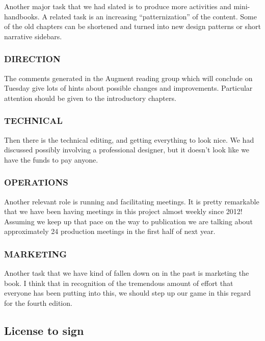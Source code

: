 Another major task that we had slated is to produce more activities and
mini-handbooks. A related task is an increasing ``patternization'' of
the content. Some of the old chapters can be shortened and turned into
new design patterns or short narrative sidebars.

\hypertarget{direction}{%
\subsubsection{DIRECTION}\label{direction}}

The comments generated in the Augment reading group which will conclude
on Tuesday give lots of hints about possible changes and improvements.
Particular attention should be given to the introductory chapters.

\hypertarget{technical}{%
\subsubsection{TECHNICAL}\label{technical}}

Then there is the technical editing, and getting everything to look
nice. We had discussed possibly involving a professional designer, but
it doesn't look like we have the funds to pay anyone.

\hypertarget{operations}{%
\subsubsection{OPERATIONS}\label{operations}}

Another relevant role is running and facilitating meetings. It is pretty
remarkable that we have been having meetings in this project almost
weekly since 2012! Assuming we keep up that pace on the way to
publication we are talking about approximately 24 production meetings in
the first half of next year.

\hypertarget{marketing}{%
\subsubsection{MARKETING}\label{marketing}}

Another task that we have kind of fallen down on in the past is
marketing the book. I think that in recognition of the tremendous amount
of effort that everyone has been putting into this, we should step up
our game in this regard for the fourth edition.

\hypertarget{license-to-sign}{%
\subsection{License to sign}\label{license-to-sign}}

